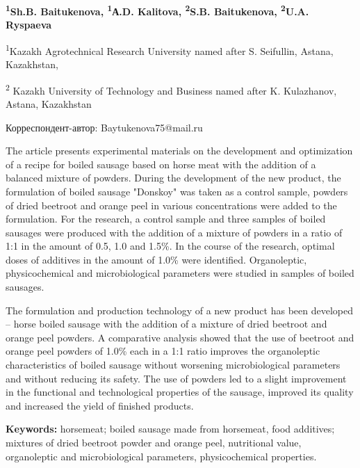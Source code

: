 
\begin{articleheader}

{\bfseries
\textsuperscript{1}Sh.B. Baitukenova\textsuperscript{\envelope },
\textsuperscript{1}А.D. Kalitova,
\textsuperscript{2}S.B. Baitukenova,
\textsuperscript{2}U.A. Ryspaeva
}
\end{articleheader}

\begin{affiliation}
\textsuperscript{1}Kazakh Agrotechnical Research University named after
S. Seifullin, Astana, Kazakhstan,

\textsuperscript{2} Kazakh University of Technology and Business named
after K. Kulazhanov, Astana, Kazakhstan

\raggedright \textsuperscript{\envelope }Корреспондент-автор: Baytukenova75@mail.ru
\end{affiliation}

The article presents experimental materials on the development and
optimization of a recipe for boiled sausage based on horse meat with the
addition of a balanced mixture of powders. During the development of the
new product, the formulation of boiled sausage "Donskoy" was taken as a
control sample, powders of dried beetroot and orange peel in various
concentrations were added to the formulation. For the research, a
control sample and three samples of boiled sausages were produced with
the addition of a mixture of powders in a ratio of 1:1 in the amount of
0.5, 1.0 and 1.5\%. In the course of the research, optimal doses of
additives in the amount of 1.0\% were identified. Organoleptic,
physicochemical and microbiological parameters were studied in samples
of boiled sausages.

The formulation and production technology of a new product has been
developed -- horse boiled sausage with the addition of a mixture of
dried beetroot and orange peel powders. A comparative analysis showed
that the use of beetroot and orange peel powders of 1.0\% each in a 1:1
ratio improves the organoleptic characteristics of boiled sausage
without worsening microbiological parameters and without reducing its
safety. The use of powders led to a slight improvement in the functional
and technological properties of the sausage, improved its quality and
increased the yield of finished products.

{\bfseries Keywords:} horsemeat; boiled sausage made from horsemeat, food
additives; mixtures of dried beetroot powder and orange peel,
nutritional value, organoleptic and microbiological parameters,
physicochemical properties.

